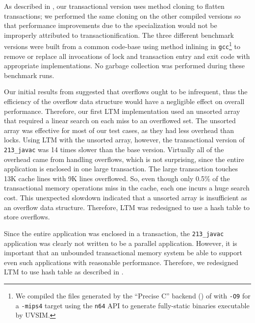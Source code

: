 As described in , our transactional version uses method
cloning to flatten transactions; we performed the same cloning on the
other compiled versions so that performance improvements due to the
specialization would not be improperly attributed to
transactionification.  The three different benchmark versions were
built from a common code-base using method inlining in \texttt{gcc}\footnote{We
compiled the files generated by the ``Precise C'' backend
() of \flex with
\texttt{-O9} for a \texttt{-mips4} target using the
\texttt{n64} API to generate fully-static binaries executable by
UVSIM.}  to remove or replace all invocations of lock and transaction
entry and exit code with appropriate implementations.  No garbage
collection was performed during these benchmark runs.

\label{sec:javac}
Our initial results from  suggested that
overflows ought to be infrequent, thus the efficiency of the overflow
data structure would 
have a negligible effect on overall performance. Therefore, our first
LTM implementation used an unsorted array that required a linear
search on each miss to an overflowed set. The unsorted array was
effective for most of our test cases, as they had less overhead than
locks.  Using LTM with the unsorted array, however, the transactional
version of \texttt{213\_javac} was 14 times slower than the base
version.  Virtually all of the overhead came from handling overflows,
which is not surprising, since the entire application is enclosed in
one large transaction. The large transaction touches 13K cache lines
with 9K lines overflowed.  So, even though only 0.5\% of the
transactional memory operations miss in the cache, each one incurs a
huge search cost. This unexpected slowdown indicated that a \naive
unsorted array is insufficient as an overflow data
structure. Therefore, LTM was redesigned to use a hash table to store
overflows.

Since the entire application was enclosed in a transaction, the
\texttt{213\_javac} application was clearly not written to be a
parallel application. However, it is important that an unbounded
transactional memory system be able to support even such applications
with reasonable performance. Therefore, we redesigned LTM to use hash
table as described in .


